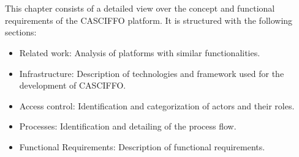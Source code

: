 \setlength{\headheight}{14.49998pt}
\chapter{}\label{ch:functionalities}

This chapter consists of a detailed view over the concept and functional requirements of the CASCIFFO platform.
It is structured with the following sections:
\begin{itemize}
    \item Related work: Analysis of platforms with similar functionalities.
    \item Infrastructure: Description of technologies and framework used for the development of CASCIFFO. 
    \item Access control: Identification and categorization of actors and their roles.
    \item Processes: Identification and detailing of the process flow.
    \item Functional Requirements: Description of functional requirements.
\end{itemize}

